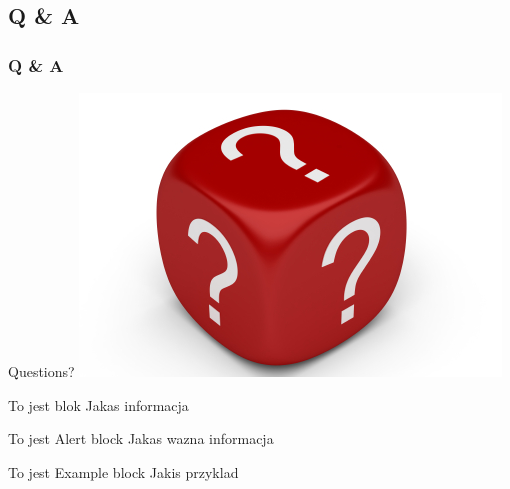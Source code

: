 \documentclass{beamer}
\begin{document}
\subsection{Q \& A}
\begin{frame}
\frametitle{Q \& A}
\begin{center}
\Huge Questions?
\includegraphics[scale=0.45]{dice_questions}
\end{center}
\end{frame}




\begin{frame}
\begin{block}{To jest blok}
Jakas informacja
\end{block}

\begin{alertblock}{To jest Alert block}
Jakas wazna informacja
\end{alertblock}

\begin{exampleblock}{To jest Example block}
Jakis przyklad
\end{exampleblock}
\end{frame}

\end{document}
